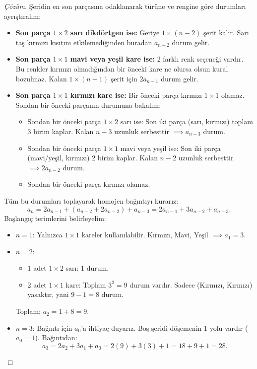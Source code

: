 \begin{proof}[Çözüm]
Şeridin en son parçasına odaklanarak türüne ve rengine göre durumları ayrıştıralım:
\begin{itemize}
    \item \textbf{Son parça $1 \times 2$ sarı dikdörtgen ise:} Geriye $1 \times (n-2)$ şerit kalır. Sarı taş kırmızı kısıtını etkilemediğinden buradan $a_{n-2}$ durum gelir.
    \item \textbf{Son parça $1 \times 1$ mavi veya yeşil kare ise:} 2 farklı renk seçeneği vardır. Bu renkler kırmızı olmadığından bir önceki kare ne olursa olsun kural bozulmaz. Kalan $1 \times (n-1)$ şerit için $2 a_{n-1}$ durum gelir.
    \item \textbf{Son parça $1 \times 1$ kırmızı kare ise:} Bir önceki parça kırmızı $1 \times 1$ olamaz. Sondan bir önceki parçanın durumuna bakalım:
    \begin{itemize}
        \item Sondan bir önceki parça $1 \times 2$ sarı ise: Son iki parça (sarı, kırmızı) toplam 3 birim kaplar. Kalan $n-3$ uzunluk serbesttir $\implies a_{n-3}$ durum.
        \item Sondan bir önceki parça $1 \times 1$ mavi veya yeşil ise: Son iki parça (mavi/yeşil, kırmızı) 2 birim kaplar. Kalan $n-2$ uzunluk serbesttir $\implies 2 a_{n-2}$ durum.
        \item Sondan bir önceki parça kırmızı olamaz.
    \end{itemize}
\end{itemize}
Tüm bu durumları toplayarak homojen bağıntıyı kurarız:
\[
a_n = 2a_{n-1} + (a_{n-2} + 2a_{n-2}) + a_{n-3} = 2a_{n-1} + 3a_{n-2} + a_{n-3}.
\]
Başlangıç terimlerini belirleyelim:
\begin{itemize}
    \item $n=1$: Yalnızca $1 \times 1$ kareler kullanılabilir. Kırmızı, Mavi, Yeşil $\implies a_1 = 3$.
    \item $n=2$: 
    \begin{itemize}
        \item 1 adet $1 \times 2$ sarı: 1 durum.
        \item 2 adet $1 \times 1$ kare: Toplam $3^2 = 9$ durum vardır. Sadece (Kırmızı, Kırmızı) yasaktır, yani $9 - 1 = 8$ durum.
    \end{itemize}
    Toplam: $a_2 = 1 + 8 = 9$.
    \item $n=3$: Bağıntı için $a_0$'a ihtiyaç duyarız. Boş şeridi döşemenin 1 yolu vardır ($a_0 = 1$).
    Bağıntıdan:
    \[
    a_3 = 2a_2 + 3a_1 + a_0 = 2(9) + 3(3) + 1 = 18 + 9 + 1 = 28.
    \]
\end{itemize}
\end{proof}

